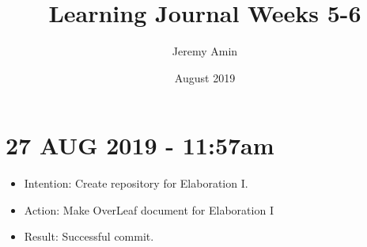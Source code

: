 \documentclass{article}
\title{Learning Journal Weeks 5-6}
\author{Jeremy Amin}
\date{August 2019}
\begin{document}
\maketitle

\section{27 AUG 2019 - 11:57am}

\begin{itemize}

\item Intention: Create repository for Elaboration I.

\item Action: Make OverLeaf document for Elaboration I

\item Result: Successful commit.

\end{itemize}
\end{document}
